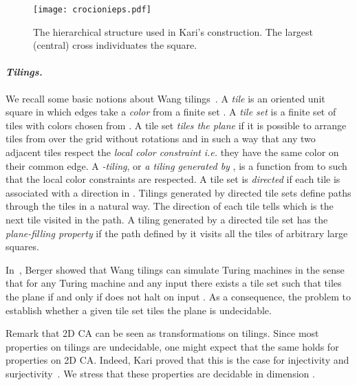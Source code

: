 \documentclass{llncs}
\makeatletter
\newcommand{\ie}{\emph{i.e.}\@\xspace}
\newcommand{\ignore}[1]{}
\makeatother
\begin{document}
\begin{figure}[t]
\begin{center}
\texttt{[image: crocionieps.pdf]}
\caption{The hierarchical structure used in Kari's construction. The largest (central) cross individuates the square.}
\label{fig:crocioni}
\end{center}
\end{figure}

\ignore{
\begin{figure}[t]
\begin{center}
\texttt{[image: peano.pdf]}
\caption{Example of plane-filling path.}
\label{ROB2}
\end{center}
\end{figure}
}


\paragraph{\emph{Tilings.}} We recall some basic notions about Wang 
tilings~\cite{wang62}.  A \emph{tile} is an oriented unit
square in which edges take a \emph{color} from a finite set .  
A \emph{tile set}  is a finite set of tiles with colors chosen from 
. A tile set  
\emph{tiles the plane} if it is possible to arrange tiles from   over the grid  without rotations and in such a way that any two adjacent tiles respect the \emph{local color constraint} \ie they have 
the same color on  their common edge. A \emph{-tiling}, or 
\emph{a tiling generated by },  is a function from  to 
 such that the local color constraints are respected.
A tile set is \emph{directed} if each tile is associated with a direction
in . Tilings generated by directed tile sets define 
paths through the tiles in a natural way. The direction of
each tile tells which is the next tile visited in the path. A tiling generated by a directed tile set has the 
\emph{plane-filling property} if the path defined by it visits all the
tiles of arbitrary large squares.


In~\cite{B66}, Berger showed that Wang tilings can simulate
Turing machines in the sense that for any Turing machine  and
any input  there exists a tile set  such that
 tiles the plane if and only if  does not halt on
input . As a consequence, the problem
to establish whether a given tile set tiles the plane is undecidable. 

Remark that 2D CA can be seen as transformations on tilings.
Since most properties on tilings are undecidable, one might expect
that the same holds for properties on 2D CA. 
Indeed, Kari proved that this is the case for injectivity 
and surjectivity~\cite{kari94a}. We stress that these properties are decidable in dimension .
\end{document}
